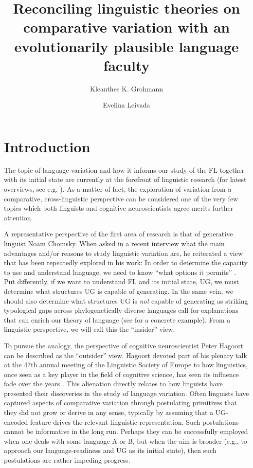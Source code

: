\documentclass[output=paper]{langsci/langscibook}
\author{Kleanthes K. Grohmann\affiliation{University of Cyprus, Cyprus
Acquisition Team}\and Evelina Leivada\affiliation{UiT The Arctic University of
Norway, Cyprus Acquisition Team}}
\title{Reconciling linguistic theories on comparative variation with an evolutionarily plausible language
faculty}
\begin{document}
\glsresetall


\section{Introduction}

The topic of language variation and how it informs our study of the \gls{FL}
together with its initial state are currently at the forefront of linguistic
research (for latest overviews, see e.g. \citealt{Hinzen2014,Trettenbrein2015,BerwickChomsky2016}). 
As a matter of fact,
the exploration of variation from a comparative, cross-linguistic perspective
can be considered one of the very few topics which both linguists and cognitive
neuroscientists agree merits further attention.

A representative perspective of the first area of research is that of
generative linguist Noam Chomsky. When asked in a recent interview what the
main advantages and/or reasons to study linguistic variation are, he reiterated
a view that has been repeatedly explored in his work: In order to determine the
capacity to use and understand language, we need to know \enquote{what options
it permits} \citep{Chomsky2015b}. Put differently, if we want to understand
\gls{FL} and its initial state, \gls{UG}, we must determine what structures
\gls{UG} is capable of generating. In the same vein, we should also determine
what structures \gls{UG} is \emph{not} capable of generating as striking
typological gaps across phylogenetically diverse languages call for
explanations that can enrich our theory of language (see
\citealt{BibHolRob2014} for a concrete example). From a linguistic perspective,
we will call this the \enquote{insider} view.

To pursue the analogy, the perspective of cognitive neuroscientist Peter
Hagoort can be described as the \enquote{outsider} view. Hagoort devoted part
of his plenary talk at the 47th annual meeting of the Linguistic Society of
Europe to how linguistics, once seen as a key player in the field of cognitive
science, has seen its influence fade over the years \citep{Hagoort2014}. This
alienation directly relates to how linguists have presented their discoveries
in the study of language variation. Often linguists have captured aspects of
comparative variation through postulating primitives that they did not grow or
derive in any sense, typically by assuming that a \gls{UG}-encoded feature
drives the relevant linguistic representation. Such postulations cannot be
informative in the long run. Perhaps they can be successfully employed when one
deals with some language A or B, but when the aim is broader (e.g., to approach
our language-readiness and \gls{UG} as its initial
state), then such postulations are rather impeding progress.
\end{document}
